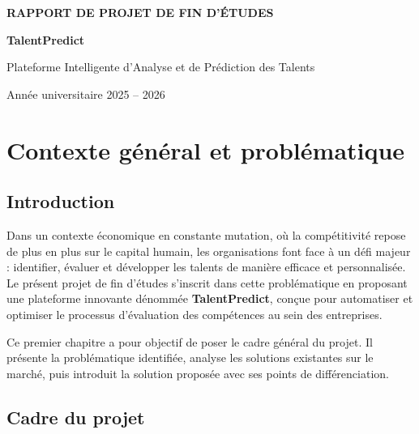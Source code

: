 \documentclass[12pt,a4paper]{report}
\begin{document}
\begin{titlepage}
  \centering
  \vspace*{2cm}
  {\Huge\bfseries\color{darkblue} RAPPORT DE PROJET DE FIN D'ÉTUDES\par}
  \vspace{1cm}
  {\Large\bfseries\color{medblue} TalentPredict\par}
  \vspace{0.5cm}
  {\large Plateforme Intelligente d'Analyse et de Prédiction des Talents\par}
  \vspace{2cm}
  \vspace{2cm}
  {\large Année universitaire 2025 – 2026\par}
\end{titlepage}

\tableofcontents
\newpage

\chapter{Contexte général et problématique}

\section{Introduction}

Dans un contexte économique en constante mutation, où la compétitivité repose de plus en plus
sur le capital humain, les organisations font face à un défi majeur : identifier, évaluer et
développer les talents de manière efficace et personnalisée. Le présent projet de fin d'études
s'inscrit dans cette problématique en proposant une plateforme innovante dénommée
\textbf{TalentPredict}, conçue pour automatiser et optimiser le processus d'évaluation des
compétences au sein des entreprises.

Ce premier chapitre a pour objectif de poser le cadre général du projet. Il présente la
problématique identifiée, analyse les solutions existantes sur le marché, puis introduit la
solution proposée avec ses points de différenciation.

\section{Cadre du projet}
\end{document}
